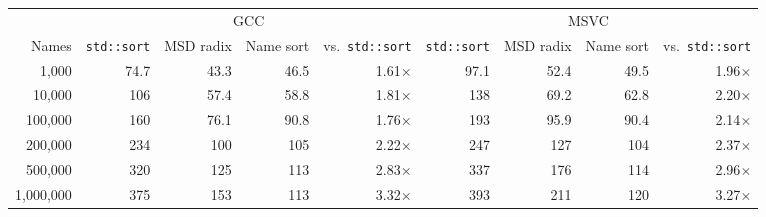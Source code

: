 \begin{tabular}{rrrrrrrrr}
\toprule
 & \multicolumn{4}{c}{GCC} & \multicolumn{4}{c}{MSVC}\\
\cmidrule(lr){2-5} \cmidrule(lr){6-9}
Names & \texttt{std::sort} & MSD radix & Name sort & vs.\ \texttt{std::sort} & \texttt{std::sort} & MSD radix & Name sort & vs.\ \texttt{std::sort}\\
\midrule
1{,}000 & 74.7 & 43.3 & 46.5 & 1.61$\times$ & 97.1 & 52.4 & 49.5 & 1.96$\times$\\
10{,}000 & 106 & 57.4 & 58.8 & 1.81$\times$ & 138 & 69.2 & 62.8 & 2.20$\times$\\
100{,}000 & 160 & 76.1 & 90.8 & 1.76$\times$ & 193 & 95.9 & 90.4 & 2.14$\times$\\
200{,}000 & 234 & 100 & 105 & 2.22$\times$ & 247 & 127 & 104 & 2.37$\times$\\
500{,}000 & 320 & 125 & 113 & 2.83$\times$ & 337 & 176 & 114 & 2.96$\times$\\
1{,}000{,}000 & 375 & 153 & 113 & 3.32$\times$ & 393 & 211 & 120 & 3.27$\times$\\
\bottomrule
\end{tabular}
